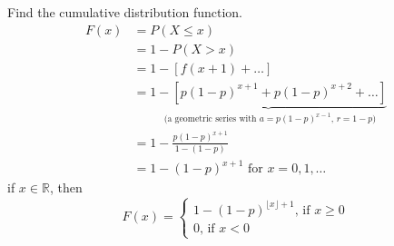 Find the cumulative distribution function.
\begin{align*}
    F(x)&=P(X\le x)\\
    &=1-P(X>x)\\
    &=1-[f(x+1)+\dots]\\
    &=\underbrace{1-[p(1-p)^{x+1}+p(1-p)^{x+2}+\dots]}_
    \text{ (a geometric series with $a=p(1-p)^{x-1}$, $r=1-p$)}\\
    &=1-\frac{p(1-p)^{x+1}}{1-(1-p)}\\
    &=1-(1-p)^{x+1} \text{ for } x=0,1,\ldots
\end{align*}
if $ x\in\mathbb{R} $, then
\[ F(x)=
\begin{cases}
    1-(1-p)^{\lfloor x \rfloor +1} \text{, if } x\ge 0\\
    0 \text{, if } x < 0
\end{cases} \]

